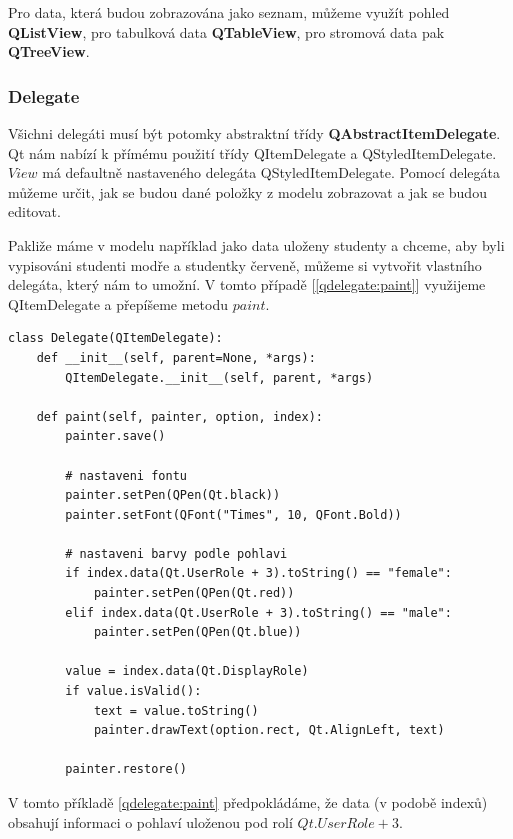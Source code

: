 Pro data, která budou zobrazována jako seznam, můžeme využít pohled \textbf{QListView}, pro tabulková data \textbf{QTableView}, pro stromová data pak \textbf{QTreeView}.

\subsubsection*{Delegate}
Všichni delegáti musí být potomky abstraktní třídy \textbf{QAbstractItemDelegate}. Qt nám nabízí k přímému použití třídy QItemDelegate a QStyledItemDelegate. $View$ má defaultně nastaveného delegáta QStyledItemDelegate. Pomocí delegáta můžeme určit, jak se budou dané položky z modelu zobrazovat a jak se budou editovat. 

Pakliže máme v modelu například jako data uloženy studenty a chceme, aby byli vypisováni studenti modře a studentky červeně, můžeme si vytvořit vlastního delegáta, který nám to umožní. V tomto případě [\lstlistingname \ref{qdelegate:paint}] využijeme QItemDelegate a přepíšeme metodu $paint$. \\

\newpage
\begin{lstlisting}[label=qdelegate:paint,caption={Delegate - přepsání metody $paint$}, morekeywords={QItemDelegate, Qt, QFont, AlignLeft, DisplayRole, UserRole, QPen}]
class Delegate(QItemDelegate):
    def __init__(self, parent=None, *args):
        QItemDelegate.__init__(self, parent, *args)

    def paint(self, painter, option, index):
        painter.save()       
        
        # nastaveni fontu
        painter.setPen(QPen(Qt.black))
        painter.setFont(QFont("Times", 10, QFont.Bold))
        
		# nastaveni barvy podle pohlavi
        if index.data(Qt.UserRole + 3).toString() == "female":
            painter.setPen(QPen(Qt.red))
        elif index.data(Qt.UserRole + 3).toString() == "male":
            painter.setPen(QPen(Qt.blue))

        value = index.data(Qt.DisplayRole)
        if value.isValid():
            text = value.toString()
            painter.drawText(option.rect, Qt.AlignLeft, text)
            
        painter.restore()
\end{lstlisting}

        
\noindent V tomto příkladě \ref{qdelegate:paint} předpokládáme, že data (v podobě indexů) obsahují informaci o pohlaví uloženou pod rolí $Qt.UserRole + 3$.

